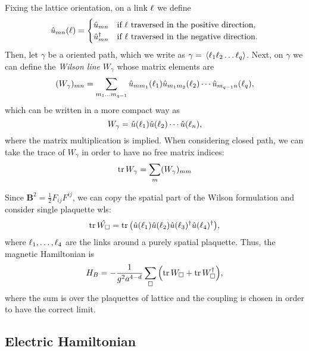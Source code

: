 Fixing the lattice orientation, on a link $\ell$ we define
\begin{equation}
    \hat{u}_{mn}(\ell) =
    \begin{cases}
        \hat{u}_{mn} & \text{if $\ell$ traversed in the positive direction}, \\
        \hat{u}_{mn}^{\dagger} & \text{if $\ell$ traversed in the negative direction}.
    \end{cases}
\end{equation}
Then, let $\gamma$ be a oriented path, which we write as $\gamma = \ev*{\link_1 \link_2 \dots \link_q}$.
Next, on $\gamma$ we can define the \emph{Wilson line} $W_{\gamma}$ whose matrix elements are
\begin{equation}
    (W_{\gamma})_{mn} =
    \sum_{m_1 \dots m_{q-1}}
        \hat{u}_{m m_1} (\ell_1)
        \hat{u}_{m_1 m_2} (\ell_2)
        \cdots
        \hat{u}_{m_{q-1} n} (\ell_q),
\end{equation}
which can be written in a more compact way as
\begin{equation}
    W_{\gamma} =
        \hat{u}(\ell_1)
        \hat{u}(\ell_2)
        \cdots
        \hat{u}(\ell_n),
\end{equation}
where the matrix multiplication is implied.
When considering closed path, we can take the trace of $W_{\gamma}$ in order to have no free matrix indices:
\begin{equation}
    \tr W_{\gamma} = \sum_{m} (W_{\gamma})_{mm}
\end{equation}

Since $\bm{B}^2 = \frac{1}{2} F_{ij} F^{ij}$, we can copy the spatial part of the Wilson formulation and consider single plaquette \ac{wl}s:
\begin{equation}
    \tr \hat{W_{\square}} = \tr \qty(
        \hat{u}(\ell_1) \hat{u}(\ell_2) \hat{u}(\ell_3)^{\dagger}  \hat{u}(\ell_4)^{\dagger}
    ),
\end{equation}
where $\ell_1, \dots, \ell_4$ are the links around a purely spatial plaquette.
Thus, the magnetic Hamiltonian is
\begin{equation}
    H_B = - \frac{1}{g^2 a^{4-d}} \sum_{\square} \qty( \tr W_{\square} + \tr W_{\square}^{\dagger} ),
\end{equation}
where the sum is over the plaquettes of lattice and the coupling is chosen in order to have the correct limit.


\subsection{Electric Hamiltonian}
\label{sub:electric_hamiltonian}

